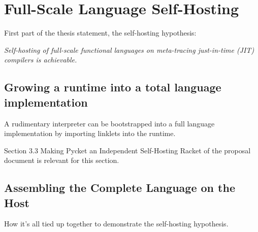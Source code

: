\chapter{Full-Scale Language Self-Hosting}

    \begin{chapterpoint}

        First part of the thesis statement, the self-hosting hypothesis:

        \textit{Self-hosting of full-scale functional languages on meta-tracing just-in-time (JIT) compilers is achievable.}
    \end{chapterpoint}

    \section{Growing a runtime into a total language implementation}

        \begin{mainpoint}
            A rudimentary interpreter can be bootstrapped into a full language implementation by importing linklets into the runtime.
        \end{mainpoint}

        \begin{todo}[Import]
			Section 3.3 Making Pycket an Independent Self-Hosting Racket of the proposal document is relevant for this section.
		\end{todo}

    \section{Assembling the Complete Language on the Host}

        \begin{mainpoint}
            How it's all tied up together to demonstrate the self-hosting hypothesis.
        \end{mainpoint}
